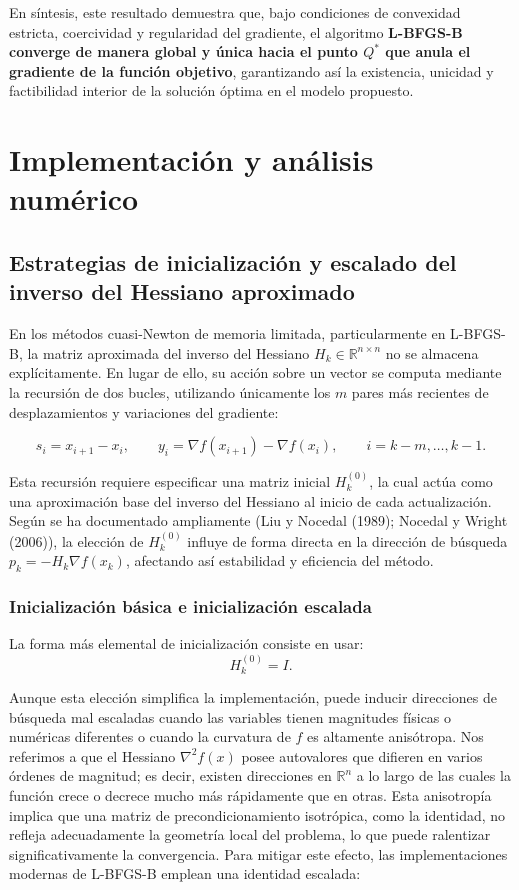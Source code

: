 \documentclass[
  spanish,
  us-letterpaper,
  DIV=11,
  numbers=noendperiod]{scrreprt}
\numberwithin{equation}{section}
\begin{document}
En síntesis, este resultado demuestra que, bajo condiciones de
convexidad estricta, coercividad y regularidad del gradiente, el
algoritmo \textbf{L-BFGS-B converge de manera global y única hacia el
punto \(Q^*\) que anula el gradiente de la función objetivo},
garantizando así la existencia, unicidad y factibilidad interior de la
solución óptima en el modelo propuesto.

\section{Implementación y análisis
numérico}\label{implementaciuxf3n-y-anuxe1lisis-numuxe9rico}

\subsection{Estrategias de inicialización y escalado del inverso del
Hessiano
aproximado}\label{estrategias-de-inicializaciuxf3n-y-escalado-del-inverso-del-hessiano-aproximado}

En los métodos cuasi-Newton de memoria limitada, particularmente en
L-BFGS-B, la matriz aproximada del inverso del Hessiano
\(H_k \in \mathbb{R}^{n \times n}\) no se almacena explícitamente. En
lugar de ello, su acción sobre un vector se computa mediante la
recursión de dos bucles, utilizando únicamente los \(m\) pares más
recientes de desplazamientos y variaciones del gradiente:

\[
s_i = x_{i+1}-x_i,
\qquad
y_i = \nabla f(x_{i+1}) - \nabla f(x_i),
\qquad
i = k-m,\dots,k-1.
\]

Esta recursión requiere especificar una matriz inicial \(H_k^{(0)}\), la
cual actúa como una aproximación base del inverso del Hessiano al inicio
de cada actualización. Según se ha documentado ampliamente (Liu y
Nocedal (1989); Nocedal y Wright (2006)), la elección de \(H_k^{(0)}\)
influye de forma directa en la dirección de búsqueda
\(p_k = -H_k \nabla f(x_k)\), afectando así estabilidad y eficiencia del
método.

\subsubsection{Inicialización básica e inicialización
escalada}\label{inicializaciuxf3n-buxe1sica-e-inicializaciuxf3n-escalada}

La forma más elemental de inicialización consiste en usar: \[
H_k^{(0)} = I.
\]

Aunque esta elección simplifica la implementación, puede inducir
direcciones de búsqueda mal escaladas cuando las variables tienen
magnitudes físicas o numéricas diferentes o cuando la curvatura de \(f\)
es altamente anisótropa. Nos referimos a que el Hessiano
\(\nabla^2 f(x)\) posee autovalores que difieren en varios órdenes de
magnitud; es decir, existen direcciones en \(\mathbb{R}^n\) a lo largo
de las cuales la función crece o decrece mucho más rápidamente que en
otras. Esta anisotropía implica que una matriz de precondicionamiento
isotrópica, como la identidad, no refleja adecuadamente la geometría
local del problema, lo que puede ralentizar significativamente la
convergencia. Para mitigar este efecto, las implementaciones modernas de
L-BFGS-B emplean una identidad escalada:
\end{document}
